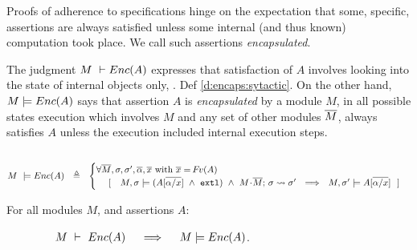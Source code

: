Proofs of adherence to specifications  hinge on the expectation that some,  specific, assertions are always satisfied unless some internal (and thus known) computation took place. 
{We call such assertions   \emph{encapsulated}.}
 

The judgment $M\ \vdash {\ensuremath Enc( A )}$  expresses that satisfaction of $A$ involves looking into the state of  
internal objects only,  \cf. Def \ref{d:encaps:sytactic}.
{On the other hand, $M  \models {\ensuremath Enc( A )}$ says that assertion $A$  is  \emph{encapsulated} by a module $M$, \ie in all possible states %
execution which involves $M$ and any set of other modules $\overline{M}$, always satisfies  $A$  unless the execution  included internal execution steps}.
 

\begin{definition} $~$ 
\label{d:encaps}

$ %
    M\ \models \encaps{A}\ \   \triangleq  \ \   
    \begin{cases}
     \forall \Mtwo, \sigma, \sigma',  \overline{\alpha}, \overline{x} \mbox{ with } \overline{x}=\fv(A)\\ %
   \ \ \ \  [\ \ \  \satisfiesA{M}{\sigma}{({A[{\overline {\alpha/x}}]} \ \wedge\ \externalexec)}\  \wedge\ { \leadstoBounded {M\madd\Mtwo}  {\sigma}{\sigma'}} %
   \ \ \Longrightarrow\ \ 
   {M},{\sigma'}\models{A[{\overline {\alpha/x}}]} \ \  ]
    \end{cases}
 $%
  \end{definition}
  
 
  \begin{lemma}
\label{lem:encap-soundness}
For all modules $M$, and assertions $A$: 

$\strut \hspace{1.5cm} M\ \vdash\ {Enc( A )} \ \ \ \ \Longrightarrow\ \ \ \ M \models {\ensuremath Enc( A )}$.
\end{lemma}

